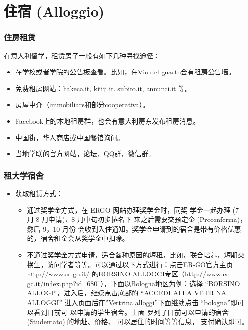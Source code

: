 \section{住宿 (Alloggio)}
\subsubsection{住房租赁}

在意大利留学，租赁房子一般有如下几种寻找途径：



\begin{itemize} 
\item 在学校或者学院的公告板查看。比如，在Via del guasto会有租房公告墙。
\item 免费租房网站：bakeca.it, kijiji.it, subito.it, annunci.it 等。
\item 房屋中介（immobiliare和部分cooperativa）。
\item Facebook上的本地租房群，也会有意大利房东发布租房消息。
\item 中国街，华人商店或中国餐馆询问。 
\item 当地学联的官方网站，论坛，QQ群，微信群。
\end{itemize} 
\subsubsection{租大学宿舍}
\begin{itemize}
\item 获取租赁方式：
	\begin{itemize}
		\item 通过奖学金方式，在 ERGO 网站办理奖学金时，同奖 
学金一起办理 (7 月-8 月申请)，8 月中旬初步排名下 
来之后需要交预定金 (Preconferma)，然后 9，10 月份 
会收到入住通知。奖学金申请到的宿舍是带有价格优惠 
的，宿舍租金会从奖学金中扣除。

		\item 不通过奖学金方式申请，适合各种原因的短租，比如，联合培养，短期交换生，访问学者等等。可以通过以下方式进行：点击ER-GO官方主页 http://www.er-go.it/ 的BORSINO ALLOGGI专区（http://www.er-go.it/index.php?id=6801），下面以Bologna地区为例：选择 “BORSINO ALLOGI”，进入后，继续点击底部的 
“ACCEDI ALLA VETRINA ALLOGGI”
进入页面后在”Vertrina alloggi”下面继续点击
“bologna”即可以看到目前可 以申请的学生宿舍。上面
罗列了目前可以申请的宿舍 (Studentato) 的地址、价格、
可以居住的时间等等信息， 
支付确认即可。

	\end{itemize} 
\end{itemize} 

